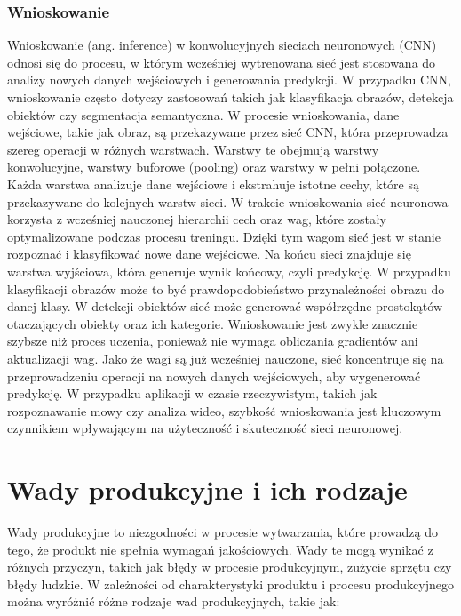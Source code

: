 \subsubsection{Wnioskowanie}
Wnioskowanie (ang. inference) w konwolucyjnych sieciach neuronowych (CNN) odnosi się do procesu, w którym wcześniej wytrenowana sieć jest stosowana do analizy nowych danych wejściowych i generowania predykcji. W przypadku CNN, wnioskowanie często dotyczy zastosowań takich jak klasyfikacja obrazów, detekcja obiektów czy segmentacja semantyczna.
W procesie wnioskowania, dane wejściowe, takie jak obraz, są przekazywane przez sieć CNN, która przeprowadza szereg operacji w różnych warstwach. Warstwy te obejmują warstwy konwolucyjne, warstwy buforowe (pooling) oraz warstwy w pełni połączone. Każda warstwa analizuje dane wejściowe i ekstrahuje istotne cechy, które są przekazywane do kolejnych warstw sieci.
W trakcie wnioskowania sieć neuronowa korzysta z wcześniej nauczonej hierarchii cech oraz wag, które zostały optymalizowane podczas procesu treningu. Dzięki tym wagom sieć jest w stanie rozpoznać i klasyfikować nowe dane wejściowe.
Na końcu sieci znajduje się warstwa wyjściowa, która generuje wynik końcowy, czyli predykcję. W przypadku klasyfikacji obrazów może to być prawdopodobieństwo przynależności obrazu do danej klasy. W detekcji obiektów sieć może generować współrzędne prostokątów otaczających obiekty oraz ich kategorie.
Wnioskowanie jest zwykle znacznie szybsze niż proces uczenia, ponieważ nie wymaga obliczania gradientów ani aktualizacji wag. Jako że wagi są już wcześniej nauczone, sieć koncentruje się na przeprowadzeniu operacji na nowych danych wejściowych, aby wygenerować predykcję. W przypadku aplikacji w czasie rzeczywistym, takich jak rozpoznawanie mowy czy analiza wideo, szybkość wnioskowania jest kluczowym czynnikiem wpływającym na użyteczność i skuteczność sieci neuronowej.
\section{Wady produkcyjne i ich rodzaje}
Wady produkcyjne to niezgodności w procesie wytwarzania, które prowadzą do tego, że produkt nie spełnia wymagań jakościowych. Wady te mogą wynikać z różnych przyczyn, takich jak błędy w procesie produkcyjnym, zużycie sprzętu czy błędy ludzkie. W zależności od charakterystyki produktu i procesu produkcyjnego można wyróżnić różne rodzaje wad produkcyjnych, takie jak:

